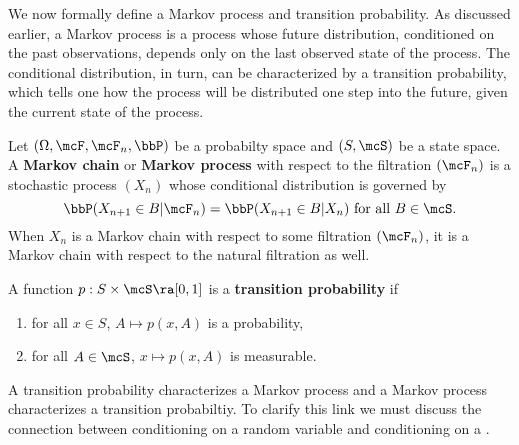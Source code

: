 \documentclass{report}
\begin{document}
\begin{example}
\begin{comment}
The more I think about this though, the more Talib doesn't make sense.   For the most part the turkey is correct.  He does have a high chance of living throughout the day.  The day that this does not occur does have a small probabilty of occuring.  It also has severe consequences.  Really, it is the consequences that are devestating.  One must have a loss function to measure how devastating these consequences are.  Relating this to finance, the turkey needs to have some sort of insurance or financial instrument he is using to make this analogy valid.  Even then, if he has calculated his probability correctly, it shouldn't matter.  One wants to include extreme events because they affect the price of an assset.  With CDO's extreme events should have made these assets much cheaper relative to the alleged return.
\end{remark}
\end{comment}
\end{example}

We now formally define a Markov process and transition probability.  As discussed earlier, a Markov process is a process whose future distribution, conditioned on the past observations, depends only on the last observed state of the process.  The conditional distribution, in turn, can be characterized by a transition probability, which tells one how the process will be distributed one step into the future, given the current state of the process.

\begin{definition}
Let $(\Omega, \mcF, \mcF_n, \bbP)$ be a probabilty space and $(S,\mcS)$ be a state space.  A \textbf{Markov chain} or \textbf{Markov process} with respect to the filtration $(\mcF_n)$ is a stochastic process $(X_n)$ whose conditional distribution is governed by
\[
\bbP(X_{n+1} \in B | \mcF_n) = \bbP(X_{n+1} \in B | X_n) \textmd{ for all } B \in \mcS.
\]
When $X_n$ is a Markov chain with respect to some filtration $(\mcF_n)$, it is a Markov chain with respect to the natural filtration as well.
\end{definition}

\begin{definition}
A function $p:S \times \mcS \ra [0,1]$ is a  \textbf{transition probability} if
\begin{enumerate}
\item for all $x \in S$, $A \mapsto p(x,A)$ is a probability,
\item for all $A \in \mcS$, $x \mapsto p(x,A)$ is measurable.
\end{enumerate}
\end{definition}

A transition probability characterizes a Markov process and a Markov process characterizes a transition probabiltiy.  To clarify this link we must discuss the connection between conditioning on a random variable and conditioning on a \sigalg.
\end{document}
